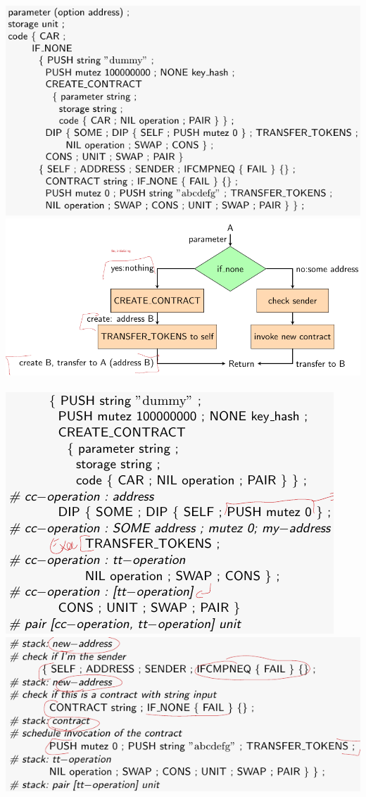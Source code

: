 \documentclass{article}
\begin{document}
\includegraphics[scale=0.3]{81.png}
\includegraphics[scale=0.3]{82.png}\\\\
\includegraphics[scale=0.3]{83.png}
\includegraphics[scale=0.3]{84.png}
\end{document}
